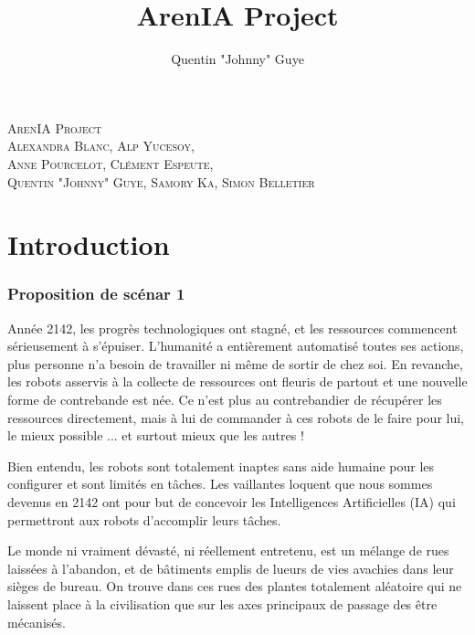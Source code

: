 \documentclass[10pt]{article}
\begin{document}
\title{\textbf{ArenIA Project}}
\author{Quentin "Johnny" Guye}
\date{}
\setlength{\headheight}{40pt}
\renewcommand{\arraystretch}{2}



\parbox[c][200pt][c]{\textwidth}{
	\begin{center}
	\textsc{\Large ArenIA Project \newline
	\\ \scriptsize Alexandra Blanc, Alp Yucesoy,\\ Anne Pourcelot, Clément Espeute, \\Quentin "Johnny" Guye, Samory Ka, Simon Belletier\\}
	\end{center}
}

\newpage

\renewcommand{\contentsname}{Sommaire}
\tableofcontents
\newpage
\part{Introduction}
\section*{Proposition de scénar 1}

Année 2142, les progrès technologiques ont stagné, et les ressources commencent sérieusement à s'épuiser. L'humanité a entièrement automatisé toutes ses actions, plus personne n'a besoin de travailler ni même de sortir de chez soi. En revanche, les robots asservis à la collecte de ressources ont fleuris de partout et une nouvelle forme de contrebande est née. Ce n'est plus au contrebandier de récupérer les ressources directement, mais à lui de commander à ces robots de le faire pour lui, le mieux possible ... et surtout mieux que les autres !

Bien entendu, les robots sont totalement inaptes sans aide humaine pour les configurer et sont limités en tâches. Les vaillantes loquent que nous sommes devenus en 2142 ont pour but de concevoir les Intelligences Artificielles (IA) qui permettront aux robots d'accomplir leurs tâches.

Le monde ni vraiment dévasté, ni réellement entretenu, est un mélange de rues laissées à l'abandon, et de bâtiments emplis de lueurs de vies avachies dans leur sièges de bureau. On trouve dans ces rues des plantes totalement aléatoire qui ne laissent place à la civilisation que sur les axes principaux de passage des être mécanisés.
\end{document}
